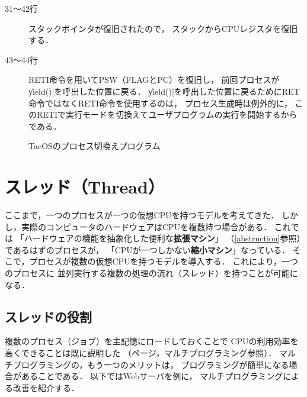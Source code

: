 \begin{description}
\item[31〜42行] スタックポインタが復旧されたので，
スタックからCPUレジスタを復旧する．

\item[43〜44行] RETI命令を用いてPSW（FLAGとPC）を復旧し，
前回プロセスが\|yield()|を呼出した位置に戻る．
\|yield()|を呼出した位置に戻るためにRET命令ではなくRETI命令を使用するのは，
プロセス生成時は例外的に，
このRETIで実行モードを切換えてユーザプログラムの実行を開始するからである．
\end{description}

\begin{figure}[btp]

\caption{TacOSのプロセス切換えプログラム}
\label{fig:tacosDispatcher}
\end{figure}

\section{スレッド（Thread）}
ここまで，一つのプロセスが一つの仮想CPUを持つモデルを考えてきた．
しかし，実際のコンピュータのハードウェアはCPUを複数持つ場合がある．
これでは
「ハードウェアの機能を抽象化した便利な{\bf 拡張マシン}」
（\ref{abstruction}参照）であるはずのプロセスが，
「CPUが一つしかない{\bf 縮小マシン}」なっている．
そこで，プロセスが複数の仮想CPUを持つモデルを導入する．
これにより，一つのプロセスに
並列実行する複数の処理の流れ（スレッド）を持つことが可能になる．

\subsection{スレッドの役割}
複数のプロセス（ジョブ）を主記憶にロードしておくことで
CPUの利用効率を高くできることは既に説明した
（\pageref{multiprogramming}ページ，マルチプログラミング参照）．
マルチプログラミングの，もう一つのメリットは，
プログラミングが簡単になる場合があることである．
以下ではWebサーバを例に，
マルチプログラミングによる改善を紹介する．


